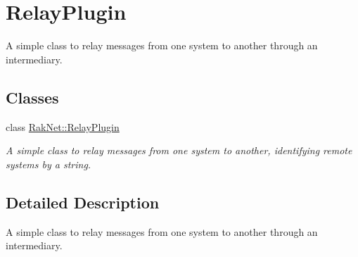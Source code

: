 \hypertarget{group___r_e_l_a_y___p_l_u_g_i_n___g_r_o_u_p}{\section{Relay\-Plugin}
\label{group___r_e_l_a_y___p_l_u_g_i_n___g_r_o_u_p}
}


A simple class to relay messages from one system to another through an intermediary.  


\subsection*{Classes}
\begin{DoxyCompactItemize}
\item 
class \hyperlink{class_rak_net_1_1_relay_plugin}{Rak\-Net\-::\-Relay\-Plugin}
\begin{DoxyCompactList}\small\item\em A simple class to relay messages from one system to another, identifying remote systems by a string. \end{DoxyCompactList}\end{DoxyCompactItemize}


\subsection{Detailed Description}
A simple class to relay messages from one system to another through an intermediary. 